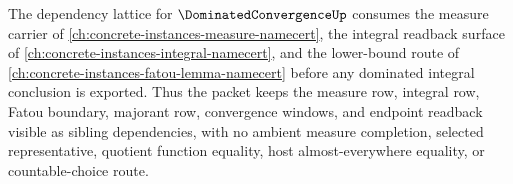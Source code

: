 The dependency lattice for $\DominatedConvergenceUp$ consumes the measure carrier of \autoref{ch:concrete-instances-measure-namecert}, the integral readback surface of \autoref{ch:concrete-instances-integral-namecert}, and the lower-bound route of \autoref{ch:concrete-instances-fatou-lemma-namecert} before any dominated integral conclusion is exported. Thus the packet keeps the measure row, integral row, Fatou boundary, majorant row, convergence windows, and endpoint readback visible as sibling dependencies, with no ambient measure completion, selected representative, quotient function equality, host almost-everywhere equality, or countable-choice route.
